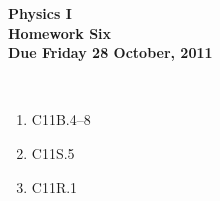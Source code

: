 \documentclass[12pt]{article}
\begin{document}
\pagestyle{empty}
 
\begin{center}
{\large {\bf Physics I}}\\
\medskip
{\large {\bf Homework Six}}\\
\medskip
{ {\bf Due Friday 28  October, 2011}}\\
\end{center}

\hspace{2mm}\\


\begin{enumerate}
\setlength{\itemsep}{-1mm}
  \item C11B.4--8
  \item C11S.5
  \item C11R.1\\
\end{enumerate}


\end{document}
